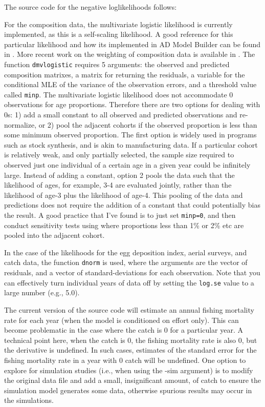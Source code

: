 \documentclass[12pt,letterpaper]{article}
\begin{document}
    The source code for the negative loglikelihoods follows:
    
    
    For the composition data, the multivariate logistic likelihood is currently implemented, as this is a self-scaling likelihood.  A good reference for this particular likelihood and how its implemented in AD Model Builder can be found in \cite{schnute1995influence}.  More recent work on the weighting of composition data is available in \cite{francis2011data}.  The function \texttt{dmvlogistic} requires 5 arguments: the observed and predicted composition matrixes, a matrix for returning the residuals, a variable for the conditional MLE of the variance of the observation errors, and a threshold value called \texttt{minp}. The multivariate logistic likelihood does not accommodate 0 observations for age proportions.  Therefore there are two options for dealing with 0s: 1) add a small constant to all observed and predicted observations and re-normalize, or 2) pool the adjacent cohorts if the observed proportion is less than some minimum observed proportion.  The first option is widely used in programs such as stock synthesis, and is akin to manufacturing data.  If a particular cohort is relatively weak, and only partially selected, the sample size required to observed just one individual of a certain age in a given year could be infinitely large.  Instead of adding a constant, option 2 pools the data such that the likelihood of ages, for example, 3-4 are evaluated jointly, rather than the likelihood of age-3 plus the likelihood of age-4.  This pooling of the data and predictions does not require the addition of a constant that could potentially bias the result.  A good practice that I've found is to just set \texttt{minp=0}, and then conduct sensitivity tests using where proportions less than 1\% or 2\% etc are pooled into the adjacent cohort.

    In the case of the likelihoods for the egg deposition index, aerial surveys, and catch data, the function \texttt{dnorm} is used, where the arguments are the vector of residuals, and a vector of standard-deviations for each observation.  Note that you can effectively turn individual years of data off by setting the \texttt{log.se} value to a large number (e.g., 5.0).

    The current version of the source code will estimate an annual fishing mortality rate for each year (when the model is conditioned on effort only).  This can become problematic in the case where the catch is 0 for a particular year.  A technical point here, when the catch is 0, the fishing mortality rate is also 0, but the derivative is undefined.  In such cases, estimates of the standard error for the fishing mortality rate in a year with 0 catch will be undefined.  One option to explore for simulation studies (i.e., when using the -sim argument) is to modify the original data file and add a small, insignificant amount, of catch to ensure the simulation model generates some data, otherwise spurious results may occur in the simulations.
\end{document}
